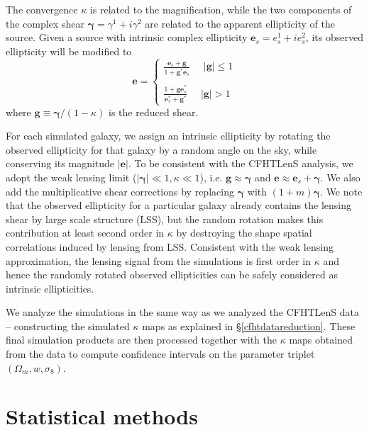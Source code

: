 \documentclass[reprint,aps,prd,superscriptaddress,showkeys,showpacs]{revtex4-1}
\begin{document}
The convergence $\kappa$ is related to
the magnification, while the two components of the complex shear
$\pmb{\gamma}=\gamma^1 + i\gamma^2$ are related to the apparent
ellipticity of the source. Given a source with intrinsic complex
ellipticity $\mathbf{e}_s=e^1_s + ie^2_s$, its observed ellipticity
will be modified to
\begin{equation}
\mathbf{e} = 
\begin{cases}
\frac{\mathbf{e}_s+\mathbf{g}}{1+\mathbf{g}^*\mathbf{e}_s} \,\,\,\,\,\,\,\, \vert \mathbf{g}\vert \leq 1 \\ \\
\frac{1+\mathbf{ge}_s^*}{\mathbf{e}_s^* + \mathbf{g}^*} \,\,\,\,\,\,\,\, \vert \mathbf{g}\vert > 1
\end{cases}
\end{equation}
where $\mathbf{g} \equiv \pmb{\gamma}/(1-\kappa)$ is the reduced shear. 

For each simulated galaxy, we assign an intrinsic ellipticity by
rotating the observed ellipticity for that galaxy by a random angle on
the sky, while conserving its magnitude $\vert\mathbf{e}\vert$. To be
consistent with the CFHTLenS analysis, we adopt the weak lensing limit
($\vert\pmb{\gamma}\vert\ll1,\kappa\ll1$), i.e.
$\mathbf{g}\approx\pmb{\gamma}$ and $\mathbf{e}\approx
\mathbf{e}_s+\pmb{\gamma}$. We also add the multiplicative shear
corrections by replacing $\pmb{\gamma}$ with $(1+m)\pmb{\gamma}$. We
note that the observed ellipticity for a particular galaxy already
contains the lensing shear by large scale structure (LSS), but the random
rotation makes this contribution at least second order in $\kappa$ by destroying the shape spatial correlations induced by lensing from LSS. Consistent with the weak lensing approximation, the lensing signal from the
simulations is first order in $\kappa$ and hence the randomly rotated
observed ellipticities can be safely considered as intrinsic
ellipticities. 

We analyze the simulations in the same way as we analyzed the CFHTLenS
data -- constructing the simulated $\kappa$ maps as explained in
\S\ref{cfhtdatareduction}. These final simulation products are then
processed together with the $\kappa$ maps obtained from the data to
compute confidence intervals on the parameter triplet
$(\Omega_m,w,\sigma_8)$.



\section{Statistical methods}
\end{document}
